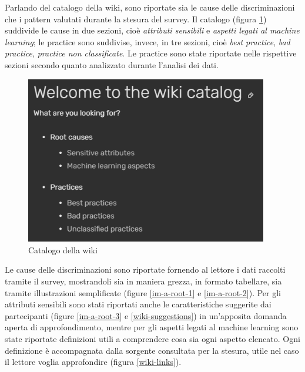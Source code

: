 Parlando del catalogo della wiki, sono riportate sia le cause delle discriminazioni che i pattern valutati durante la stesura del survey. Il catalogo (figura \ref{wiki-catalog}) suddivide le cause in due sezioni, cioè \emph{attributi sensibili} e \emph{aspetti legati al machine learning}; le practice sono suddivise, invece, in tre sezioni, cioè \emph{best practice}, \emph{bad practice}, \emph{practice non classificate}. Le practice sono state riportate nelle rispettive sezioni secondo quanto analizzato durante l'analisi dei dati.

\begin{figure}[h!]
    \centering
    \includegraphics[width=300pt]{figure/catalog/catalog.png}
    \caption{Catalogo della wiki}
    \label{wiki-catalog}
\end{figure}

Le cause delle discriminazioni sono riportate fornendo al lettore i dati raccolti tramite il survey, mostrandoli sia in maniera grezza, in formato tabellare, sia tramite illustrazioni semplificate (figure \ref{im-a-root-1} e \ref{im-a-root-2}). Per gli attributi sensibili sono stati riportati anche le caratteristiche suggerite dai partecipanti (figure \ref{im-a-root-3} e \ref{wiki-suggestions}) in un'apposita domanda aperta di approfondimento, mentre per gli aspetti legati al machine learning sono state riportate definizioni utili a comprendere cosa sia ogni aspetto elencato. Ogni definizione è accompagnata dalla sorgente consultata per la stesura, utile nel caso il lettore voglia approfondire (figura \ref{wiki-links}).

